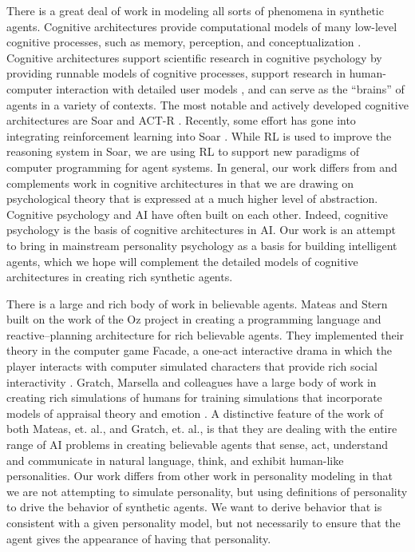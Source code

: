 There is a great deal of work in modeling all sorts of phenomena in synthetic agents.  Cognitive architectures provide computational models of many low-level cognitive processes, such as memory, perception, and conceptualization \cite{jones2005an-introduction,langley2008cognitive}.  Cognitive architectures support scientific research in cognitive psychology by providing runnable models of cognitive processes, support research in human-computer interaction with detailed user models \cite{john1998cognitive}, and can serve as the ``brains'' of agents in a variety of contexts.  The most notable and actively developed cognitive architectures are Soar \cite{laird2008extending} and ACT-R \cite{anderson2004an-integrated}.  Recently, some effort has gone into integrating reinforcement learning into Soar \cite{nason2008soar-rl}.  While RL is used to improve the reasoning system in Soar, we are using RL to support new paradigms of computer programming for agent systems.  In general, our work differs from and complements work in cognitive architectures in that we are drawing on psychological theory that is expressed at a much higher level of abstraction.  Cognitive psychology and AI have often built on each other.  Indeed, cognitive psychology is the basis of cognitive architectures in AI.  Our work is an attempt to bring in mainstream personality psychology as a basis for building intelligent agents, which we hope will complement the detailed models of cognitive architectures in creating rich synthetic agents.

There is a large and rich body of work in believable agents.  Mateas and Stern built on the work of the Oz project \cite{loyall1991hap} in creating a programming language and reactive--planning architecture for rich believable agents. They implemented their theory in the computer game Facade, a one-act interactive drama in which the player interacts with computer simulated characters that provide rich social interactivity \cite{mateas2004life-like}.  Gratch, Marsella and colleagues have a large body of work in creating rich simulations of humans for training simulations that incorporate models of appraisal theory and emotion \cite{gratch2005lessons,swartout2006toward}.  A distinctive feature of the work of both Mateas, et. al., and Gratch, et. al., is that they are dealing with the entire range of AI problems in creating believable agents that sense, act, understand and communicate in natural language, think, and exhibit human-like personalities.  Our work differs from other work in personality modeling in that we are not attempting to simulate personality, but using definitions of personality to drive the behavior of synthetic agents.  We want to derive behavior that is consistent with a given personality model, but not necessarily to ensure that the agent gives the appearance of having that personality.


